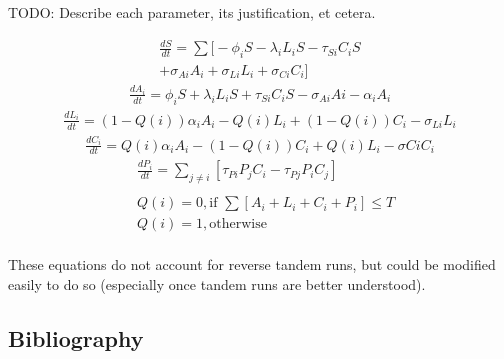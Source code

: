\documentclass[letterpaper]{article}
\begin{document}
TODO: Describe each parameter, its justification, et cetera.

\begin{multline}
    \frac{dS}{dt} = \sum \big[ -\phi_iS - \lambda_iL_iS - \tau_{Si}C_iS \\ + \sigma_{Ai}A_i + \sigma_{Li}L_i + \sigma_{Ci}C_i \big]
\end{multline}
\begin{multline}
    \frac{dA_i}{dt} = \phi_iS + \lambda_iL_iS + \tau_{Si}C_iS - \sigma_{Ai}Ai - \alpha_iA_i
\end{multline}
\begin{multline}
    \frac{dL_i}{dt} = (1-Q(i))\alpha_iA_i - Q(i)L_i + (1 - Q(i))C_i - \sigma_{Li}L_i
\end{multline}
\begin{multline}
    \frac{dC_i}{dt} = Q(i)\alpha_iA_i - (1 - Q(i))C_i + Q(i)L_i - \sigma{Ci}C_i
\end{multline}
\begin{equation}
\begin{aligned}
  & \frac{dP_i}{dt} = \sum_{j \neq i} [\tau_{Pi}P_jC_i - \tau_{Pj}P_iC_j]\\\\
  & Q(i) = 0, \text{if    } \sum [A_i + L_i + C_i + P_i] \leq T \\
  & Q(i) = 1, \text{otherwise} \\
\end{aligned}
\end{equation}

These equations do not account for reverse tandem runs, but could be modified easily to do so (especially once tandem runs are better understood).

  \subsection{Bibliography}
      

\footnotesize


\end{document}
